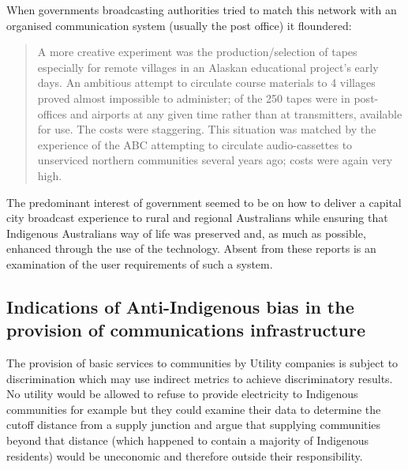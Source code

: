 When governments broadcasting authorities tried to match this network with an organised communication system (usually the post office) it floundered:
\begin{quotation}
A more creative experiment was the production/selection of tapes especially for remote villages in an Alaskan educational project's early days. An ambitious attempt to circulate course materials to 4 villages proved almost impossible to administer;  of the 250 tapes were in post-offices and airports at any given time rather than at transmitters, available for use. The costs were staggering. This situation was matched by the experience of the ABC attempting to circulate audio-cassettes to unserviced northern communities several years ago; costs were again very high\cite[p.89]{RefWorks:79}.
\end{quotation}

The predominant interest of government seemed to be on how to deliver a capital city broadcast experience to rural and regional Australians while ensuring that Indigenous Australians way of life was preserved and, as much as possible, enhanced through the use of the technology. Absent from these reports is an examination of the user requirements of such a system.

\subsection{Indications of Anti-Indigenous bias in the provision of communications infrastructure}
The provision of basic services to communities by Utility companies is subject to discrimination which may use indirect metrics to achieve discriminatory results. No utility would be allowed to refuse to provide electricity to Indigenous communities for example but they could examine their data to determine the cutoff distance from a supply junction and argue that supplying communities beyond that distance (which happened to contain a majority of Indigenous residents) would be uneconomic and therefore outside their responsibility. 


